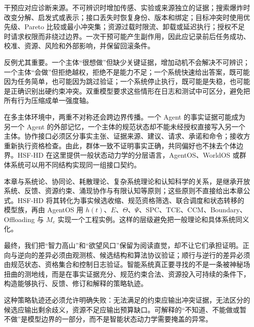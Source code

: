 干预应对应诊断来源。不可辨识时增加传感、实验或来源独立的证据；搜索爆炸时改变分解、启发式或表示；接口丢失时恢复身份、版本和绑定；目标冲突时使用优先级、Pareto 比较或最小冲突集；资源过载时限流、卸载或延迟执行；授权不足时请求权限而非绕过边界。一次干预可能产生副作用，因此应记录前后任务成功、校准、资源、风险和外部影响，并保留回滚条件。

反例尤其重要。一个主体“很想做”但缺少关键证据，增加动机不会解决不可辨识；一个主体“会做”但拒绝越权，拒绝不是能力不足；一个系统快速给出答案，既可能因为任务简单，也可能因为跳过验证；一个系统停止执行，既可能是失稳，也可能是正确识别出硬约束冲突。双重模型要求这些情形在日志和测试中可区分，避免把所有行为压缩成单一强度轴。

在多主体环境中，两重不对称还会跨边界传播。一个 Agent 的事实证据可能成为另一个 Agent 的外部记忆，一个主体的规范状态却不能未经授权直接写入另一个主体。协作接口必须区分事实主张、证据来源、建议、请求、承诺和命令；接收方重新执行资格检查。由此，群体一致不证明事实正确，共同偏好也不抹去个体边界。HSF-HD 在这里提供一般状态动力学的分层语言，AgentOS、WorldOS 或群体系统可以用不同结构实现同一组接口契约。

本章与系统论、协同论、耗散理论、复杂系统理论和认知科学的关系，是继承开放系统、反馈、资源约束、涌现协作与有限认知等原则；这些原则不直接给出本章公式。HSF-HD 将其转化为事实候选收缩、规范资格筛选、联合调度和状态转移的模型族，再由 AgentOS 用 $h(t)$、$E$、$\Theta$、$\Psi$、SPC、TCE、CCM、Boundary、Offloading 与 $M_e$ 实现一个工程实例。这样的层级避免把一般理论和具体系统同义化。

最终，我们把“智力高山”和“欲望风口”保留为阅读直觉，却不让它们承担证明。正向与逆向的差异必须由观测核、候选结构和算法协议验证；顺行与逆行的差异必须由规范状态、资格集合和控制日志验证。智能系统真正要寻找的不是一条被神秘场扭曲的测地线，而是在事实证据充分、规范约束合法、资源投入可持续的条件下，构造能够执行、反馈、修订和解释的策略轨迹。

这种策略轨迹还必须允许明确失败：无法满足的约束应输出冲突证据，无法区分的候选应输出剩余歧义，资源不足应输出预算缺口。可解释的“不知道、不能做或暂不做”是模型边界的一部分，而不是智能状态动力学需要掩盖的异常。
